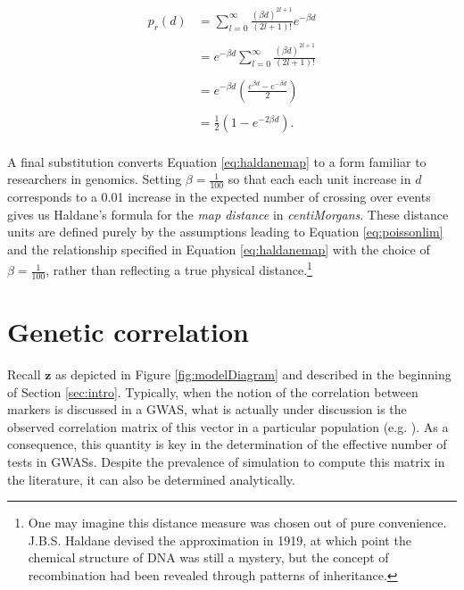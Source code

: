 \documentclass{article}
\newcommand{\ve}[1]{\mathbf{#1}}           %
\begin{document}
\begin{equation} \label{eq:haldanemap}
  \begin{split}
    p_r(d) & = \sum_{l = 0}^{\infty} \frac{(\beta d)^{2l + 1}}{(2l + 1)!} e^{-\beta d} \\
    & \\
    & = e^{-\beta d} \sum_{l = 0}^{\infty} \frac{(\beta d)^{2l + 1}}{(2l + 1)!} \\
    & \\
    & = e^{-\beta d} \left ( \frac{e^{\beta d} - e^{- \beta d}}{2} \right ) \\
    & \\
    & = \frac{1}{2} \left ( 1 - e^{-2 \beta d} \right ) .\\
  \end{split}
\end{equation}

\noindent A final substitution converts Equation \ref{eq:haldanemap} to a form familiar to researchers in genomics. Setting $\beta = \frac{1}{100}$ so that each each unit increase in $d$ corresponds to a 0.01 increase in the expected number of crossing over events gives us Haldane's formula for the \textit{map distance} in \textit{centiMorgans}. These distance units are defined purely by the assumptions leading to Equation \ref{eq:poissonlim} and the relationship specified in Equation \ref{eq:haldanemap} with the choice of $\beta = \frac{1}{100}$, rather than reflecting a true physical distance.\footnote{One may imagine this distance measure was chosen out of pure convenience. J.B.S. Haldane devised the approximation in 1919, at which point the chemical structure of DNA was still a mystery, but the concept of recombination had been revealed through patterns of inheritance.}

\section{Genetic correlation} \label{subsec:correlation}

Recall $\ve{z}$ as depicted in Figure \ref{fig:modelDiagram} and described in the beginning of Section \ref{sec:intro}. Typically, when the notion of the correlation between markers is discussed in a GWAS, what is actually under discussion is the observed correlation matrix of this vector in a particular population (e.g. \cite{cheverud2001}). As a consequence, this quantity is key in the determination of the effective number of tests in GWASs. Despite the prevalence of simulation to compute this matrix in the literature, it can also be determined analytically.
\end{document}
